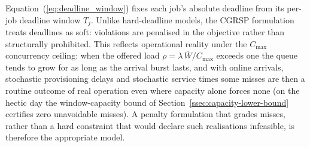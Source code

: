 Equation~(\ref{eq:deadline_window}) fixes each job's absolute deadline from its per-job deadline window $T_j$. Unlike hard-deadline models, the CGRSP formulation treats deadlines as soft: violations are penalised in the objective rather than structurally prohibited. This reflects operational reality under the $C_{\max}$ concurrency ceiling: when the offered load $\rho = \lambda\,\overline{W}/C_{\max}$ exceeds one the queue tends to grow for as long as the arrival burst lasts, and with online arrivals, stochastic provisioning delays and stochastic service times some misses are then a routine outcome of real operation even where capacity alone forces none (on the hectic day the window-capacity bound of Section~\ref{ssec:capacity-lower-bound} certifies zero unavoidable misses). A penalty formulation that grades misses, rather than a hard constraint that would declare such realisations infeasible, is therefore the appropriate model.

